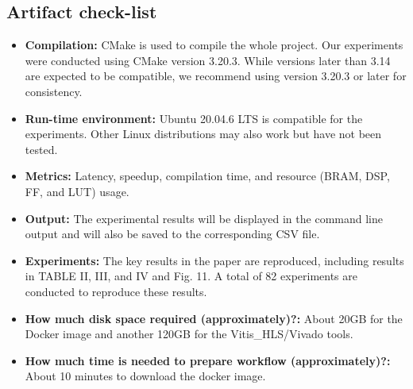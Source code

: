 \documentclass[conference]{IEEEtran}
\begin{document}
\subsection{Artifact check-list}
\label{sec:link}
{\small
\begin{itemize}
  \item {\bf Compilation: } CMake is used to compile the whole project. Our experiments were conducted using CMake version 3.20.3. While versions later than 3.14 are expected to be compatible, we recommend using version 3.20.3 or later for consistency.
  \item {\bf Run-time environment: } Ubuntu 20.04.6 LTS is compatible for the experiments. Other Linux distributions may also work but have not been tested.
  \item {\bf Metrics: } Latency, speedup, compilation time, and resource (BRAM, DSP, FF, and LUT) usage. 
  \item {\bf Output: }  The experimental results will be displayed in the command line output and will also be saved to the corresponding CSV file.
  \item {\bf Experiments: } The key results in the paper are reproduced, including results in TABLE II, III, and IV and Fig. 11. A total of 82 experiments are conducted to reproduce these results.
  \item {\bf How much disk space required (approximately)?: } About 20GB for the Docker image and another 120GB for the Vitis\_HLS/Vivado tools.
  \item {\bf How much time is needed to prepare workflow (approximately)?: } About 10 minutes to download the docker image.

\end{itemize}}
\end{document}

